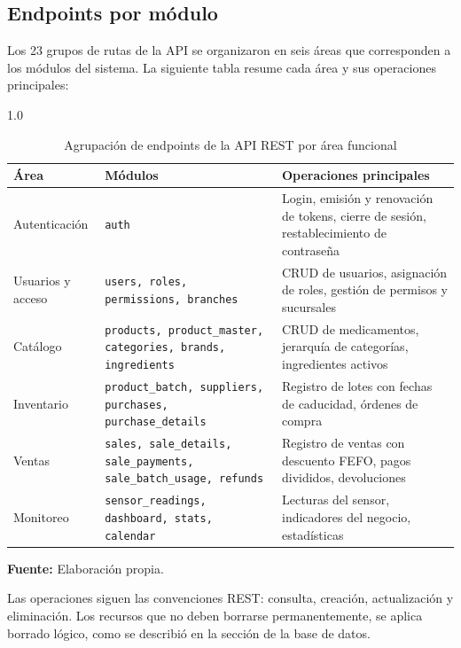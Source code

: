 \newpage
\subsection{Endpoints por módulo}

Los 23 grupos de rutas de la API se organizaron en seis áreas que corresponden a los módulos del sistema. La siguiente tabla resume cada área y sus operaciones principales:

\begin{table}[H]
\centering
\caption{Agrupación de endpoints de la API REST por área funcional}
\label{tab:cap3-endpoints}
\begin{spacing}{1.0}
\renewcommand{\arraystretch}{1.2}
\begin{tabularx}{\textwidth}{@{}l >{\raggedright}p{3.8cm} X@{}}
\toprule
\textbf{Área} & \textbf{Módulos} & \textbf{Operaciones principales} \\
\midrule
Autenticación      & \texttt{auth}                                                             & Login, emisión y renovación de tokens, cierre de sesión, restablecimiento de contraseña \\[4pt]
Usuarios y acceso  & \texttt{users, roles, permissions, branches}                              & CRUD de usuarios, asignación de roles, gestión de permisos y sucursales \\[4pt]
Catálogo           & \texttt{products, product\_master, categories, brands, ingredients}        & CRUD de medicamentos, jerarquía de categorías, ingredientes activos \\[4pt]
Inventario         & \texttt{product\_batch, suppliers, purchases, purchase\_details}           & Registro de lotes con fechas de caducidad, órdenes de compra \\[4pt]
Ventas             & \texttt{sales, sale\_details, sale\_payments, sale\_batch\_usage, refunds} & Registro de ventas con descuento FEFO, pagos divididos, devoluciones \\[4pt]
Monitoreo          & \texttt{sensor\_readings, dashboard, stats, calendar}                     & Lecturas del sensor, indicadores del negocio, estadísticas \\
\bottomrule
\end{tabularx}
\end{spacing}
\vspace{0.2cm}
\footnotesize \textbf{Fuente:} Elaboración propia.
\end{table}

Las operaciones siguen las convenciones REST: consulta, creación, actualización y eliminación. Los recursos que no deben borrarse permanentemente, se aplica borrado lógico, como se describió en la sección de la base de datos.

